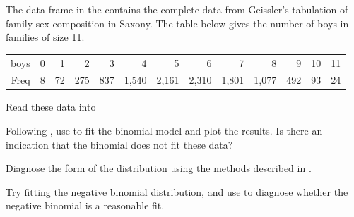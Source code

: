 \documentclass[10pt,krantz2]{krantz}\usepackage[]{graphicx}\usepackage[]{color}
\begin{document}
\begin{Exercises}
  \exercise The data frame  in the  contains the complete data from Geissler's \citeyearpar{Geissler:1889} tabulation of family sex composition in Saxony.  The table below gives the number of boys in families of size 11.

\begin{tabular}{rrrrrrrrrrrrr}
  \hline
boys &   0 &   1 &   2 &   3 &   4 &   5 &   6 &   7 &   8 &   9 &  10 &  11 \\
  Freq &   8 &  72 & 275 & 837 & 1,540 & 2,161 & 2,310 & 1,801 & 1,077 & 492 &  93 &  24 \\
   \hline
\end{tabular}

  \begin{enumerate*}
    \item Read these data into \R
    \item Following , use  to fit the binomial model and plot the
    results.  Is there an indication that the binomial does not fit these data?
    \item Diagnose the form of the distribution using the methods described in .
    \item Try fitting the negative binomial distribution, and use  to diagnose
    whether the negative binomial is a reasonable fit.
  \end{enumerate*}


\end{Exercises}
\end{document}
